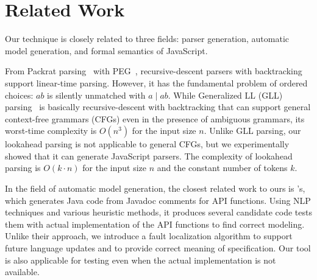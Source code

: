 \section{Related Work}\label{sec:related}
Our technique is closely related to three fields: parser generation,
automatic model generation, and formal semantics of JavaScript.

From Packrat parsing~\cite{packrat} with PEG~\cite{peg}, recursive-descent
parsers with backtracking support linear-time parsing.  However, it
has the fundamental problem of ordered choices: \( ab \) is silently
unmatched with \( a \mid ab \).  While Generalized LL (GLL) parsing~\cite{gll}
is basically recursive-descent with backtracking that can support general
context-free grammars (CFGs) even in the presence of ambiguous grammars,
its worst-time complexity is \( O(n^3) \) for the input size \( n \).
Unlike GLL parsing, our lookahead parsing is not applicable to general CFGs,
but we experimentally showed that it can generate JavaScript parsers.
The complexity of lookahead parsing is \( O(k \cdot n) \) for the input size
\( n \) and the constant number of tokens \( k \).

In the field of automatic model generation, the closest related work to
ours is \citet{javadoc}'s, which generates Java code from Javadoc comments
for API functions.  Using NLP techniques and various heuristic methods,
it produces several candidate code tests them with actual implementation
of the API functions to find correct modeling.  Unlike their approach, we
introduce a fault localization algorithm to support future language
updates and to provide correct meaning of specification. Our tool is also
applicable for testing even when the actual implementation is not available.






